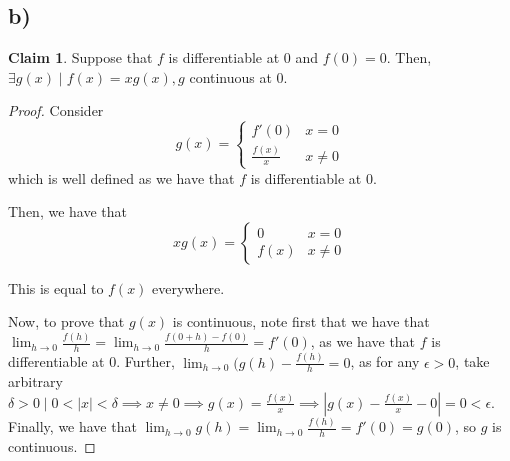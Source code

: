 \documentclass[12pt,letterpaper]{article}
\theoremstyle{definition}
\newtheorem*{claim}{Claim}
\begin{document}
\subsection*{b)}

\begin{claim}
  Suppose that $f$ is differentiable at $0$ and $f(0) = 0$. Then, $\exists g(x)
  \mid f(x) = xg(x), g$ continuous at $0$.
\end{claim}

\begin{proof}
  Consider
  \[
    g(x) = \begin{cases}
      f'(0) & x = 0 \\
      \frac{f(x)}{x} & x \neq 0
    \end{cases}
  \]
  which is well defined as we have that $f$ is differentiable at 0.
  
  Then, we have that
  \[
    xg(x) = \begin{cases}
      0 & x = 0 \\
      f(x) & x \neq 0
    \end{cases}
  \]

  This is equal to $f(x)$ everywhere.

  Now, to prove that $g(x)$ is continuous, note first that we have that
  $\lim_{h\rightarrow 0} \frac{f(h)}{h} = \lim_{h\rightarrow 0}\frac{f(0 + h) -
    f(0)}{h} = f'(0)$, as we have that $f$ is differentiable at 0. Further,
  $\lim_{h\rightarrow 0} (g(h) - \frac{f(h)}{h} = 0$, as for any $\epsilon > 0$,
  take arbitrary $\delta > 0 \mid 0 < |x| < \delta \implies x \neq 0 \implies
  g(x) = \frac{f(x)}{x} \implies |g(x) - \frac{f(x)}{x} - 0| = 0 < \epsilon$.
  Finally, we have that $\lim_{h\rightarrow 0}g(h) = \lim_{h\rightarrow
    0}\frac{f(h)}{h} = f'(0) = g(0)$, so $g$ is continuous.
\end{proof}
\end{document}
